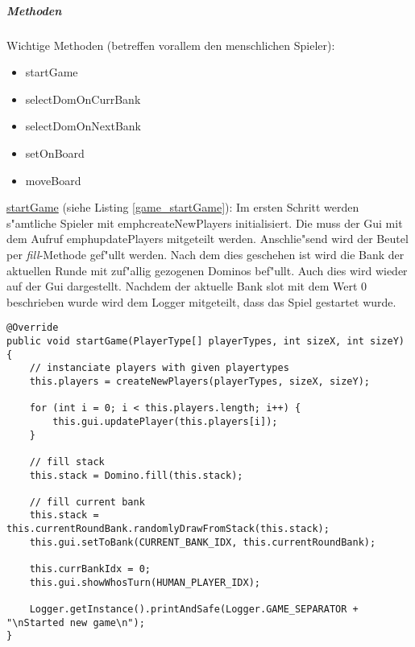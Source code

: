 \subparagraph{Methoden}
Wichtige Methoden (betreffen vorallem den menschlichen Spieler): 
\begin{itemize}
	\item startGame
	\item selectDomOnCurrBank
	\item selectDomOnNextBank
	\item setOnBoard
	\item moveBoard
\end{itemize}

\underline{startGame} (siehe Listing \ref{game_startGame}): Im ersten Schritt werden s"amtliche Spieler mit emph{createNewPlayers} initialisiert. Die muss der Gui mit dem Aufruf emph{updatePlayers} mitgeteilt werden. Anschlie"send wird der Beutel per \emph{fill}-Methode gef"ullt werden. Nach dem dies geschehen ist wird die Bank der aktuellen Runde mit zuf"allig gezogenen Dominos bef"ullt. Auch dies wird wieder auf der Gui dargestellt. Nachdem der aktuelle Bank slot mit dem Wert 0 beschrieben wurde wird dem Logger mitgeteilt, dass das Spiel gestartet wurde. 

\begin{lstlisting}[float,style=CodeHighlighting,label=game_startGame,caption=Game - startGame]
@Override
public void startGame(PlayerType[] playerTypes, int sizeX, int sizeY) {
    // instanciate players with given playertypes
    this.players = createNewPlayers(playerTypes, sizeX, sizeY);

    for (int i = 0; i < this.players.length; i++) {
        this.gui.updatePlayer(this.players[i]);
    }

    // fill stack
    this.stack = Domino.fill(this.stack);

    // fill current bank
    this.stack = this.currentRoundBank.randomlyDrawFromStack(this.stack);
    this.gui.setToBank(CURRENT_BANK_IDX, this.currentRoundBank);

    this.currBankIdx = 0;
    this.gui.showWhosTurn(HUMAN_PLAYER_IDX);

    Logger.getInstance().printAndSafe(Logger.GAME_SEPARATOR + "\nStarted new game\n");
}
\end{lstlisting}

